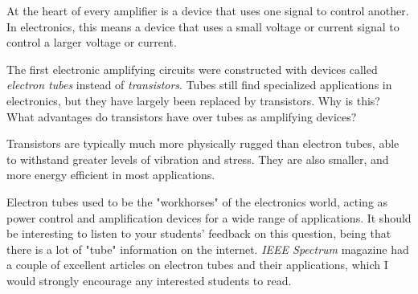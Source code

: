 

At the heart of every amplifier is a device that uses one signal to control another.  In electronics, this means a device that uses a small voltage or current signal to control a larger voltage or current.

The first electronic amplifying circuits were constructed with devices called {\it electron tubes} instead of {\it transistors}.  Tubes still find specialized applications in electronics, but they have largely been replaced by transistors.  Why is this?  What advantages do transistors have over tubes as amplifying devices? 







Transistors are typically much more physically rugged than electron tubes, able to withstand greater levels of vibration and stress.  They are also smaller, and more energy efficient in most applications.







Electron tubes used to be the "workhorses" of the electronics world, acting as power control and amplification devices for a wide range of applications.  It should be interesting to listen to your students' feedback on this question, being that there is a lot of "tube" information on the internet.  {\it IEEE Spectrum} magazine had a couple of excellent articles on electron tubes and their applications, which I would strongly encourage any interested students to read.




